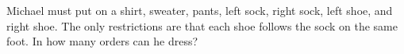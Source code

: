 Michael must put on a shirt, sweater, pants, left sock, right sock, left shoe, and right shoe. The only restrictions are that each shoe follows the sock on the same foot. In how many orders can he dress?
